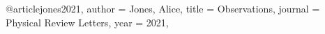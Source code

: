 @article{jones2021,
  author = {Jones, Alice},
  title = {Observations},
  journal = {Physical Review Letters},
  year = {2021},
}
